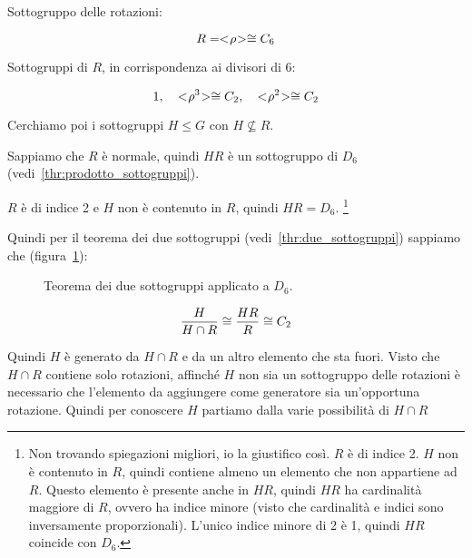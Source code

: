 Sottogruppo delle rotazioni:

\begin{equation}
	R = < \negmedspace \rho \negmedspace > \cong C_6
\end{equation}

Sottogruppi di $R$, in corrispondenza ai divisori di 6:

\begin{equation}
	1, \quad < \negmedspace \rho^3 \negmedspace > \cong C_2, \quad < \negmedspace \rho^2 \negmedspace > \cong C_2
\end{equation}

Cerchiamo poi i sottogruppi $H \le G$ con $H \not\subseteq R$.

Sappiamo che $R$ è normale, quindi $HR$ è un sottogruppo di $D_6$ (vedi~\ref{thr:prodotto_sottogruppi}).

$R$ è di indice 2 e $H$ non è contenuto in $R$, quindi $HR = D_6$.
\footnote{
Non trovando spiegazioni migliori, io la giustifico così.
$R$ è di indice 2. $H$ non è contenuto in $R$, quindi contiene almeno un elemento che non appartiene ad $R$. 
Questo elemento è presente anche in $HR$, quindi $HR$ ha cardinalità maggiore di $R$, ovvero ha indice minore (visto che cardinalità e indici sono inversamente proporzionali). L'unico indice minore di 2 è 1, quindi $HR$ coincide con $D_6$.
}

Quindi per il teorema dei due sottogruppi (vedi~\ref{thr:due_sottogruppi}) sappiamo che (figura~\ref{fig:Isometrie_due_sottogruppi}):

\begin{figure}[tp]
	\centering
	\caption{Teorema dei due sottogruppi applicato a $D_6$.}
	\label{fig:Isometrie_due_sottogruppi}
\end{figure}


\begin{equation}
	\dfrac{H}{H \cap R} \cong \dfrac{HR}{R} \cong C_2 
\end{equation}

Quindi $H$ è generato da $H \cap R$ e da un altro elemento che sta fuori. Visto che $H \cap R$ contiene solo rotazioni, affinché $H$ non sia un sottogruppo delle rotazioni è necessario che l'elemento da aggiungere come generatore sia un'opportuna rotazione. Quindi per conoscere $H$ partiamo dalla varie possibilità di $H \cap R$
	
